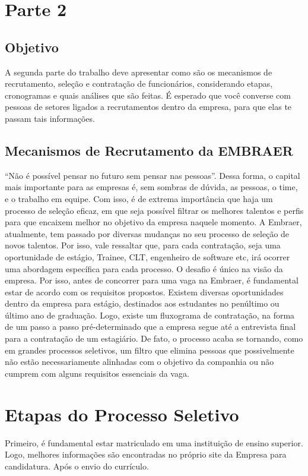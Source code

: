 \chapter{Parte 2}
\section{Objetivo}
A segunda parte do trabalho deve apresentar como são os mecanismos de recrutamento, seleção e contratação de funcionários, considerando etapas, cronogramas e quais análises que são feitas. É esperado que você converse com pessoas de setores ligados a recrutamentos dentro da empresa, para que elas te passam tais informações. 



\section{Mecanismos de Recrutamento da EMBRAER}
“Não é possível pensar no futuro sem pensar nas pessoas”. Dessa forma, o capital mais importante para as empresas é, sem sombras de dúvida, as pessoas, o time, e o trabalho em equipe. Com isso, é de extrema importância que haja um processo de seleção eficaz, em que seja possível filtrar os melhores talentos e perfis para que encaixem melhor no objetivo da empresa naquele momento. 
	A Embraer, atualmente, tem passado por diversas mudanças no seu processo de seleção de novos talentos. Por isso, vale ressaltar que, para cada contratação, seja uma oportunidade de  estágio, Trainee, CLT, engenheiro de software etc, irá ocorrer uma abordagem específica para cada processo. O desafio é único na visão da empresa. Por isso, antes de concorrer para uma vaga na Embraer, é fundamental  estar de acordo com os requisitos propostos. Existem diversas oportunidades dentro da empresa para estágio,  destinados aos estudantes no penúltimo ou último ano de graduação. Logo, existe um fluxograma de contratação,  na forma de um passo a passo pré-determinado que a empresa segue até a entrevista final para a contratação de um estagiário. De fato, o processo acaba se tornando, como em grandes processos seletivos, um filtro  que elimina pessoas que possivelmente não estão necessariamente alinhadas com o objetivo da companhia ou  não cumprem com alguns requisitos essenciais da vaga. 


\chapter{Etapas do Processo Seletivo}
Primeiro, é fundamental estar matriculado em uma instituição de ensino superior. Logo, melhores informações são encontradas no próprio site da Empresa para candidatura. Após o envio do currículo.



